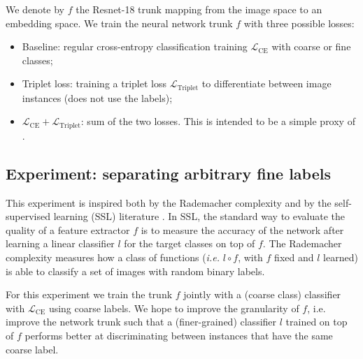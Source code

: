 We denote by $f$ the Resnet-18 trunk mapping from the image space to an embedding space. 
We train the neural network trunk $f$ with three possible losses: 
\begin{itemize}
    \item 
    Baseline: regular cross-entropy classification training $\mathcal{L}_\mathrm{CE}$ with coarse or fine classes; 
    \item
    Triplet loss: training a triplet loss $\mathcal{L}_\mathrm{Triplet}$ to differentiate between image instances (does not use the labels);
    \item
    $\mathcal{L}_\mathrm{CE} + \mathcal{L}_\mathrm{Triplet}$: sum of the two losses. 
    This is intended to be a simple proxy of \ours.
\end{itemize}



\subsection{Experiment: separating arbitrary fine labels}  
\label{sec:analysis}

This experiment is inspired both by the Rademacher complexity \cite{Boucheron2005Rademacher} and by the self-supervised learning (SSL) literature \cite{Berthelot2019ReMixMatchSL}.  
In SSL, the standard way to evaluate the quality of a feature extractor $f$ is to measure the accuracy of the network after learning a linear classifier $l$ for the target classes on top of $f$. 
The Rademacher complexity measures how a  class of functions (\textit{i.e.} $l\circ f$, with $f$ fixed and $l$ learned) is able to classify a set of images with random binary labels.

For this experiment we train the trunk $f$ jointly with a (coarse class) classifier with $\mathcal{L}_\mathrm{CE}$ using coarse labels.
We hope to improve the granularity of $f$, i.e. improve the network trunk such that a (finer-grained) classifier $l$ trained on top of $f$ performs better at discriminating between instances that have the same coarse label. 

